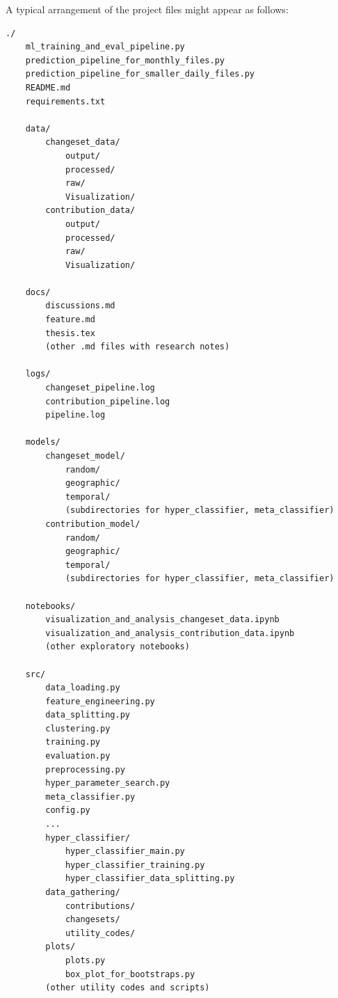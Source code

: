 \documentclass[
    13pt, %
    a4paper, %
    listof=totoc, %
    bibliography=totoc, %
    index=totoc, %
    headsepline
]{scrreprt}
\begin{document}
A typical arrangement of the project files might appear as follows:
\begin{verbatim}
./
    ml_training_and_eval_pipeline.py
    prediction_pipeline_for_monthly_files.py
    prediction_pipeline_for_smaller_daily_files.py
    README.md
    requirements.txt

    data/
        changeset_data/
            output/
            processed/
            raw/
            Visualization/
        contribution_data/
            output/
            processed/
            raw/
            Visualization/

    docs/
        discussions.md
        feature.md
        thesis.tex
        (other .md files with research notes)

    logs/
        changeset_pipeline.log
        contribution_pipeline.log
        pipeline.log

    models/
        changeset_model/
            random/
            geographic/
            temporal/
            (subdirectories for hyper_classifier, meta_classifier)
        contribution_model/
            random/
            geographic/
            temporal/
            (subdirectories for hyper_classifier, meta_classifier)

    notebooks/
        visualization_and_analysis_changeset_data.ipynb
        visualization_and_analysis_contribution_data.ipynb
        (other exploratory notebooks)

    src/
        data_loading.py
        feature_engineering.py
        data_splitting.py
        clustering.py
        training.py
        evaluation.py
        preprocessing.py
        hyper_parameter_search.py
        meta_classifier.py
        config.py
        ...
        hyper_classifier/
            hyper_classifier_main.py
            hyper_classifier_training.py
            hyper_classifier_data_splitting.py
        data_gathering/
            contributions/
            changesets/
            utility_codes/
        plots/
            plots.py
            box_plot_for_bootstraps.py
        (other utility codes and scripts)
\end{verbatim}
\end{document}
